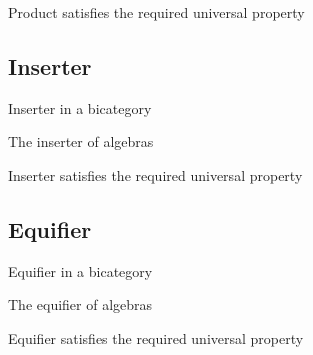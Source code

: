 \begin{proposition}
Product satisfies the required universal property
\end{proposition}

\subsection{Inserter}

\begin{definition}
Inserter in a bicategory
\end{definition}

\begin{definition}
The inserter of algebras
\end{definition}

\begin{proposition}
Inserter satisfies the required universal property
\end{proposition}

\subsection{Equifier}

\begin{definition}
Equifier in a bicategory
\end{definition}

\begin{definition}
The equifier of algebras
\end{definition}

\begin{proposition}
Equifier satisfies the required universal property
\end{proposition}
